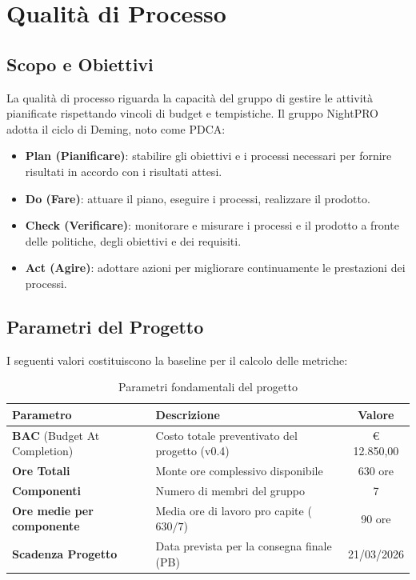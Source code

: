\documentclass[a4paper,11pt,oneside]{scrartcl}
\begin{document}
\newpage
\section{Qualità di Processo}

\subsection{Scopo e Obiettivi}
La qualità di processo riguarda la capacità del gruppo di gestire le attività pianificate rispettando vincoli di budget e tempistiche. Il gruppo NightPRO adotta il ciclo di Deming{\scriptsize{}}, noto come PDCA{\scriptsize{}}:

\begin{itemize}
    \item \textbf{Plan (Pianificare)}: stabilire gli obiettivi e i processi necessari per fornire risultati in accordo con i risultati attesi.
    \item \textbf{Do (Fare)}: attuare il piano, eseguire i processi, realizzare il prodotto.
    \item \textbf{Check (Verificare)}: monitorare e misurare i processi e il prodotto a fronte delle politiche, degli obiettivi e dei requisiti.
    \item \textbf{Act (Agire)}: adottare azioni per migliorare continuamente le prestazioni dei processi.
\end{itemize}

\subsection{Parametri del Progetto}
I seguenti valori costituiscono la baseline{\scriptsize{}} per il calcolo delle metriche:

\begin{table}[h!]
\centering
\renewcommand{\arraystretch}{1.3}
\begin{tabularx}{\textwidth}{lXc}
\toprule
\textbf{Parametro} & \textbf{Descrizione} & \textbf{Valore} \\
\midrule
\textbf{BAC} (Budget At Completion) & Costo totale preventivato del progetto (v0.4) & € 12.850,00 \\
\textbf{Ore Totali} & Monte ore complessivo disponibile & 630 ore \\
\textbf{Componenti} & Numero di membri del gruppo & 7 \\
\textbf{Ore medie per componente} & Media ore di lavoro pro capite ($630/7$) & 90 ore \\
\textbf{Scadenza Progetto} & Data prevista per la consegna finale (PB{\scriptsize\raisebox{-0.5ex}{G}}) & 21/03/2026 \\
\bottomrule
\end{tabularx}
\caption{Parametri fondamentali del progetto}
\end{table}
\end{document}
